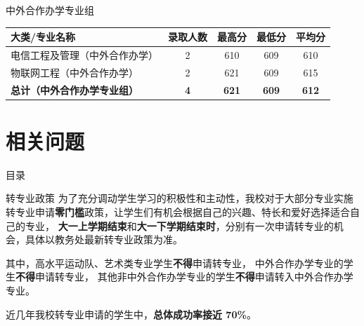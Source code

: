 \documentclass[aspectratio=169, utf8]{beamer}
\begin{document}
\begin{frame}{中外合作办学专业组}
    \begin{table}
        \centering
        \begin{tabular}{lcccc}
            \toprule
            \textcolor{Fore}{\textbf{大类/专业名称}}       & \textcolor{Fore}{\textbf{录取人数}} & \textcolor{Fore}{\textbf{最高分}} & \textcolor{Fore}{\textbf{最低分}} & \textcolor{Fore}{\textbf{平均分}} \\ \midrule
            电信工程及管理（中外合作办学）                          & 2                               & 610                            & 609                            & 610                            \\
            物联网工程（中外合作办学）                            & 2                               & 621                            & 609                            & 615                            \\
            \textcolor{Fore}{\textbf{总计（中外合作办学专业组）}} & \textcolor{Fore}{\textbf{4}}    & \textcolor{Fore}{\textbf{621}} & \textcolor{Fore}{\textbf{609}} & \textcolor{Fore}{\textbf{612}} \\ \midrule
        \end{tabular}
    \end{table}
\end{frame}

\section{相关问题}

\begin{frame}{目录}
    \begin{multicols}{2}
        \tableofcontents[currentsection]
    \end{multicols}
\end{frame}

\begin{frame}{转专业政策}
    为了充分调动学生学习的积极性和主动性，我校对于大部分专业实施转专业申请\textcolor{Fore}{\textbf{零门槛}}政策，让学生们有机会根据自己的兴趣、特长和爱好选择适合自己的专业，
    \textcolor{Fore}{\textbf{大一上学期结束}}和\textcolor{Fore}{\textbf{大一下学期结束时}}，分别有一次申请转专业的机会，具体以教务处最新转专业政策为准。

    其中，高水平运动队、艺术类专业学生\textcolor{Fore}{\textbf{不得}}申请转专业，
    中外合作办学专业的学生\textcolor{Fore}{\textbf{不得}}申请转专业，
    其他非中外合作办学专业的学生\textcolor{Fore}{\textbf{不得}}申请转入中外合作办学专业。

    近几年我校转专业申请的学生中，\textcolor{Fore}{\textbf{总体成功率接近 70\%}}。
\end{frame}
\end{document}

